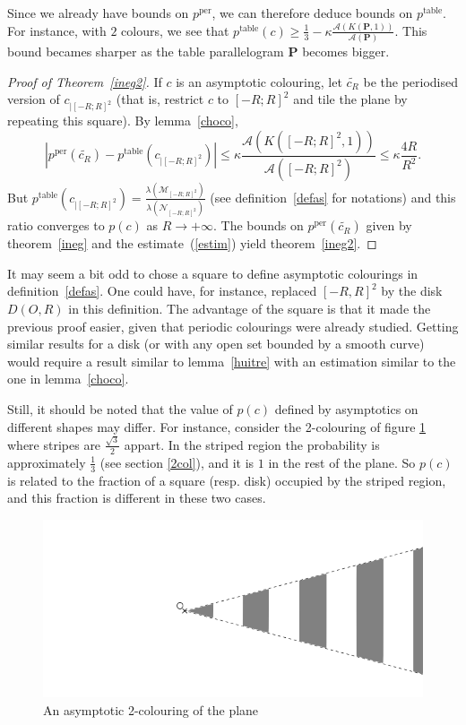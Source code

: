 \documentclass[a4paper,11pt]{article}
\theoremstyle{definition}
\theoremstyle{remark}
\newcommand{\M}{\mathcal{M}}
\newcommand{\N}{\mathcal{N}}
\newcommand{\pper}{p^{\mathrm{per}}}
\newcommand{\ptable}{p^{\mathrm{table}}}
\begin{document}
Since we already have bounds on $\pper$, we can therefore deduce bounds on $\ptable$.
For instance, with $2$ colours, we see that 
$\ptable(c) \geq \frac13 - \kappa \frac{\mathcal{A}(K(\mathbf{P},1))}{\mathcal{A}(\mathbf{P})}$. 
This bound becames sharper as the table parallelogram $\mathbf{P}$ becomes bigger.
\begin{proof}[Proof of Theorem~\ref{ineg2}]
If $c$ is an asymptotic colouring, let $\tilde{c_R}$ be the periodised version of $c_{|[-R;R]^2}$ (that is, restrict $c$ to $[-R;R]^2$ and tile the plane by repeating this square). By lemma~\ref{choco},
\begin{equation} \label{estim}
|\pper(\tilde{c_R}) - \ptable(c_{|[-R;R]^2}) | \leq \kappa \frac{\mathcal{A}(K([-R;R]^2,1))}{\mathcal{A}([-R;R]^2)} \leq \kappa \frac{4R}{R^2}.
\end{equation}
But $\ptable(c_{|[-R;R]^2}) = \frac{\lambda (\M_{[-R;R]^2})}{\lambda (\N_{[-R;R]^2})}$ (see definition~\ref{defas} for notations) and this ratio converges to $p(c)$ as $R\rightarrow +\infty$. The bounds on $\pper(\tilde{c_R})$ given by theorem~\ref{ineg} and the estimate~(\ref{estim}) yield theorem~\ref{ineg2}.
\end{proof}

It may seem a bit odd to chose a square to define asymptotic colourings in definition~\ref{defas}. One could have, for instance, replaced $[-R,R]^2$ by the disk $D(O,R)$ in this definition. The advantage of the square is that it made the previous proof easier, given that periodic colourings were already studied. Getting similar results for a disk (or with any open set bounded by a smooth curve) would require a result similar to lemma~\ref{huitre} with an estimation similar to the one in lemma~\ref{choco}.

Still, it should be noted that the value of $p(c)$ defined by asymptotics on different shapes may differ. For instance, consider the 2-colouring of figure \ref{contrex} where stripes are $\frac{\sqrt{3}}{2}$ appart. In the striped region the probability is approximately $\frac13$ (see section \ref{2col}), and it is $1$ in the rest of the plane. So $p(c)$ is related to the fraction of a square (resp. disk) occupied by the striped region, and this fraction is different in these two cases.

\begin{figure}[h]
\center
\includegraphics[scale=0.5]{contrex.png}
\caption{\label{contrex} An asymptotic 2-colouring of the plane}
\end{figure}
\end{document}
